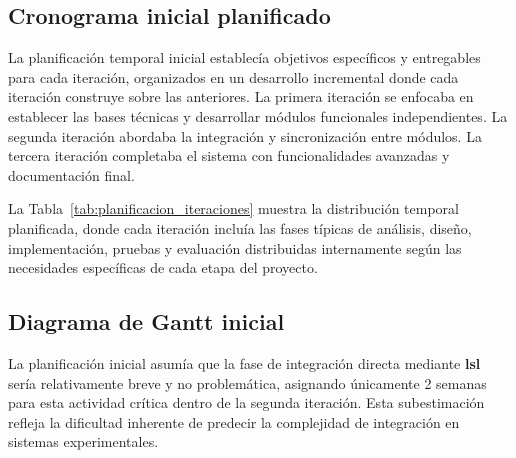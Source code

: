 \subsection{Cronograma inicial planificado}
\label{subsec:cronograma_inicial}

La planificación temporal inicial establecía objetivos específicos y entregables para cada iteración, organizados en un desarrollo incremental donde cada iteración construye sobre las anteriores. La primera iteración se enfocaba en establecer las bases técnicas y desarrollar módulos funcionales independientes. La segunda iteración abordaba la integración y sincronización entre módulos. La tercera iteración completaba el sistema con funcionalidades avanzadas y documentación final.

\begin{table}[htbp!]
  \centering
  \caption{Planificación inicial de iteraciones del proyecto}
  \label{tab:planificacion_iteraciones}
\end{table}

La Tabla~\ref{tab:planificacion_iteraciones} muestra la distribución temporal planificada, donde cada iteración incluía las fases típicas de análisis, diseño, implementación, pruebas y evaluación distribuidas internamente según las necesidades específicas de cada etapa del proyecto.

\subsection{Diagrama de Gantt inicial}
\label{subsec:gantt_inicial}

La planificación inicial asumía que la fase de integración directa mediante \textbf{\acrshort{lsl}} sería relativamente breve y no problemática, asignando únicamente 2 semanas para esta actividad crítica dentro de la segunda iteración. Esta subestimación refleja la dificultad inherente de predecir la complejidad de integración en sistemas experimentales.

